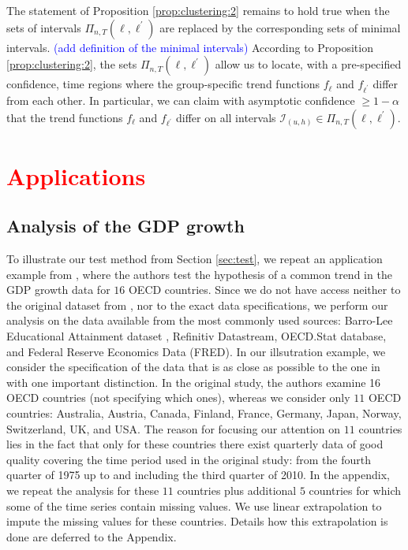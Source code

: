 \documentclass[a4paper,12pt]{article}
\begin{document}
The statement of Proposition \ref{prop:clustering:2} remains to hold true when the sets of intervals $\Pi_{n,T}(\ell,\ell^\prime)$ are replaced by the corresponding sets of minimal intervals. \textcolor{blue}{(add definition of the minimal intervals)}  According to Proposition \ref{prop:clustering:2}, the sets $\Pi_{n,T}(\ell,\ell^\prime)$ allow us to locate, with a pre-specified confidence, time regions where the group-specific trend functions $f_\ell$ and $f_{\ell^\prime}$ differ from each other. In particular, we can claim with asymptotic confidence $\ge 1 - \alpha$ that the trend functions $f_\ell$ and $f_{\ell^\prime}$ differ on all intervals $\mathcal{I}_{(u,h)} \in \Pi_{n,T}(\ell,\ell^\prime)$.


\section{\textcolor{red}{Applications}}\label{sec:app}
\subsection{Analysis of the GDP growth}\label{subsec:app:gdp}


To illustrate our test method from Section \ref{sec:test}, we repeat an application example from \cite{Zhang2012}, where the authors test the hypothesis of a common trend in the GDP growth data for $16$ OECD countries. Since we do not have access neither to the original dataset from \cite{Zhang2012}, nor to the exact data specifications, we perform our analysis on the data available from the most commonly used sources: Barro-Lee Educational Attainment dataset \citep*{Barro2013}, Refinitiv Datastream, OECD.Stat database, and Federal Reserve Economics Data (FRED). In our illsutration example, we consider the specification of the data that is as close as possible to the one in \linebreak \cite{Zhang2012} with one important distinction. In the original study, the authors examine 16 OECD countries (not specifying which ones), whereas we consider only $11$ OECD countries: Australia, Austria, Canada, Finland, France, Germany, Japan, Norway, Switzerland, UK, and USA. The reason for focusing our attention on $11$ countries lies in the fact that only for these countries there exist quarterly data of good quality covering the time period used in the original study: from the fourth quarter of 1975 up to and including the third quarter of 2010. In the appendix, we repeat the analysis for these $11$ countries plus additional $5$ countries for which some of the time series contain missing values. We use linear extrapolation to impute the missing values for these countries. Details how this extrapolation is done are deferred to the Appendix.
\end{document}
